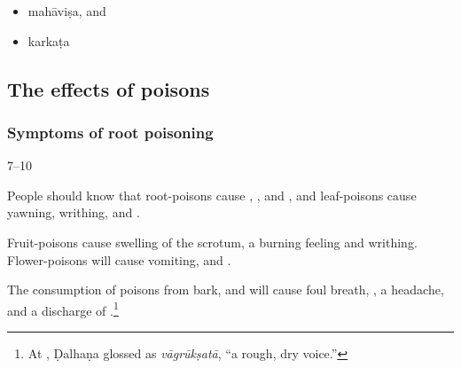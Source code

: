 \begin{translation}
\begin{itemize}
\item \gls{mahāviṣa},
and 
\item \gls{karkaṭa}
            \end{itemize}


    
\subsection{The effects of poisons}

\subsubsection{Symptoms of root poisoning}
    \item[7--10]
    
People should know that root-poisons cause ,
, and , and  leaf-poisons
cause yawning, writhing, and .
    
 Fruit-poisons cause swelling of the
   scrotum, a burning feeling and writhing.  Flower-poisons will
    cause vomiting,  and .  
    
The consumption of poisons from bark,  and
 will cause foul breath, ,
a headache, and a discharge of .\footnote{At
    , Ḍalhaṇa glossed  as
    \emph{vāgrūkṣatā}, “a rough, dry voice.”}
    

\end{translation}
